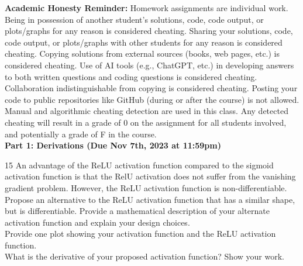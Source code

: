 \documentclass[11pt]{article}
\begin{document}
\textbf{Academic Honesty Reminder:} Homework assignments are individual work. Being in possession of another student's solutions, code, code output, or plots/graphs for any reason is considered cheating. Sharing your solutions, code, code output, or plots/graphs with other students for any reason is considered cheating. Copying solutions from external sources (books, web pages, etc.) is considered cheating. Use of AI tools (e.g., ChatGPT, etc.) in developing answers to both written questions and coding questions is considered cheating. Collaboration indistinguishable from copying is considered cheating. Posting your code to public repositories like GitHub (during or after the course) is not allowed. Manual and algorithmic cheating detection are used in this class. Any detected cheating will result in a grade of 0 on the assignment for all students involved, and potentially a grade of F in the course. 
\\

\textbf{Part 1: Derivations (Due Nov 7th, 2023 at 11:59pm)}

\begin{problem}{15} An advantage of the ReLU activation function compared to the sigmoid activation function is that the RelU activation does not suffer from the vanishing gradient problem. However, the ReLU activation function is non-differentiable. \\

 Propose an alternative to the ReLU activation function that has a similar shape, but is differentiable.  Provide a mathematical description of your alternate activation function and explain your design choices.\\

 Provide one plot showing your activation function and the ReLU activation function.\\

 What is the derivative of your proposed activation function? Show your work.

\end{problem}
\end{document}
